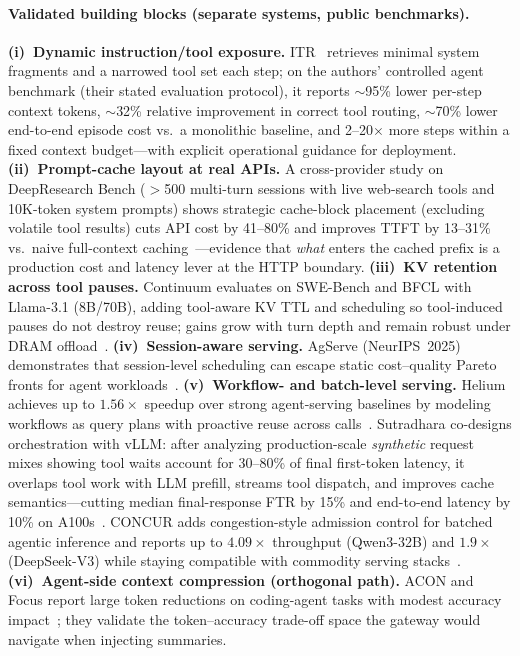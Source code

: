 \begin{opportunity}
\paragraph{Validated building blocks (separate systems, public benchmarks).}
\textbf{(i)~Dynamic instruction/tool exposure.}
ITR~\cite{itr2026} retrieves minimal system fragments and a narrowed
tool set each step; on the authors' controlled agent benchmark (their
stated evaluation protocol), it reports $\sim$95\% lower per-step
context tokens, $\sim$32\% relative improvement in correct tool
routing, $\sim$70\% lower end-to-end episode cost vs.\ a monolithic
baseline, and 2--20$\times$ more steps within a fixed context
budget---with explicit operational guidance for deployment.
\textbf{(ii)~Prompt-cache layout at real APIs.}
A cross-provider study on DeepResearch Bench ($>$500 multi-turn
sessions with live web-search tools and 10K-token system prompts)
shows strategic cache-block placement (excluding volatile tool
results) cuts API cost by 41--80\% and improves TTFT by 13--31\%
vs.\ naive full-context caching~\cite{dontbreakcache2026}---evidence
that \emph{what} enters the cached prefix is a production cost and
latency lever at the HTTP boundary.
\textbf{(iii)~KV retention across tool pauses.}
Continuum evaluates on SWE-Bench and BFCL with Llama-3.1 (8B/70B),
adding tool-aware KV TTL and scheduling so tool-induced pauses do
not destroy reuse; gains grow with turn depth and remain robust under
DRAM offload~\cite{continuum2025}.
\textbf{(iv)~Session-aware serving.}
AgServe (NeurIPS~2025) demonstrates that session-level scheduling can
escape static cost--quality Pareto fronts for agent
workloads~\cite{agserve2025}.
\textbf{(v)~Workflow- and batch-level serving.}
Helium achieves up to $1.56\times$ speedup over strong agent-serving
baselines by modeling workflows as query plans with proactive reuse
across calls~\cite{helium2026}.
Sutradhara co-designs orchestration with vLLM: after analyzing
production-scale \emph{synthetic} request mixes showing tool waits
account for 30--80\% of final first-token latency, it overlaps tool
work with LLM prefill, streams tool dispatch, and improves cache
semantics---cutting median final-response FTR by 15\% and end-to-end
latency by 10\% on A100s~\cite{sutradhara2026}.
CONCUR adds congestion-style admission control for batched agentic
inference and reports up to $4.09\times$ throughput (Qwen3-32B) and
$1.9\times$ (DeepSeek-V3) while staying compatible with commodity
serving stacks~\cite{concur2026}.
\textbf{(vi)~Agent-side context compression (orthogonal path).}
ACON and Focus report large token reductions on coding-agent tasks
with modest accuracy impact~\cite{acon2025, focus2026}; they validate
the token--accuracy trade-off space the gateway would navigate when
injecting summaries.


\end{opportunity}

